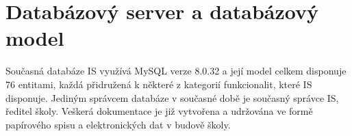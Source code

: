\documentclass[FM,Proj]{tulthesis}
\begin{document}
\section{Databázový server a databázový model}
Současná databáze IS využívá MySQL verze 8.0.32 a její model celkem disponuje 76 entitami,
každá přidružená k některé z kategorií funkcionalit, které IS disponuje. Jediným správcem 
databáze v současné době je současný správce IS, ředitel školy. 
Veškerá dokumentace je již vytvořena a udržována ve formě papírového spisu a elektronických
dat v budově školy.

\end{document}
